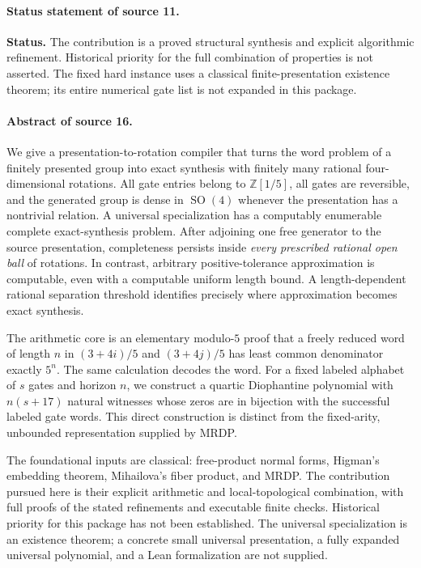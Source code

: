 \documentclass[11pt,letterpaper]{article}
\numberwithin{equation}{section}
\theoremstyle{definition}
\theoremstyle{remark}
\newcommand{\Z}{\mathbb Z}
\newcommand{\SO}{\operatorname{SO}}
\begin{document}
\paragraph{Status statement of source 11.}
\noindent\textbf{Status.} The contribution is a proved structural synthesis
and explicit algorithmic refinement. Historical priority for the full
combination of properties is not asserted. The fixed hard instance uses a
classical finite-presentation existence theorem; its entire numerical gate
list is not expanded in this package.
\paragraph{Abstract of source 16.}
We give a presentation-to-rotation compiler that turns the word problem of a
finitely presented group into exact synthesis with finitely many rational
four-dimensional rotations. All gate entries belong to $\Z[1/5]$, all gates
are reversible, and the generated group is dense in $\SO(4)$ whenever the
presentation has a nontrivial relation. A universal specialization has a
computably enumerable complete exact-synthesis problem. After adjoining one
free generator to the source presentation, completeness persists inside
\emph{every prescribed rational open ball} of rotations. In contrast,
arbitrary positive-tolerance approximation is computable, even with a
computable uniform length bound. A length-dependent rational separation
threshold identifies precisely where approximation becomes exact synthesis.

The arithmetic core is an elementary modulo-$5$ proof that a freely reduced
word of length $n$ in $(3+4i)/5$ and $(3+4j)/5$ has least common denominator
exactly $5^n$. The same calculation decodes the word. For a fixed labeled
alphabet of $s$ gates and horizon $n$, we construct a quartic Diophantine
polynomial with $n(s+17)$ natural witnesses whose zeros are in bijection
with the successful labeled gate words. This direct construction is distinct
from the fixed-arity, unbounded representation supplied by MRDP.

The foundational inputs are classical: free-product normal forms, Higman's
embedding theorem, Mihailova's fiber product, and MRDP. The contribution
pursued here is their explicit arithmetic and local-topological combination,
with full proofs of the stated refinements and executable finite checks.
Historical priority for this package has not been established. The universal
specialization is an existence theorem; a concrete small universal
presentation, a fully expanded universal polynomial, and a Lean
formalization are not supplied.
\end{document}
